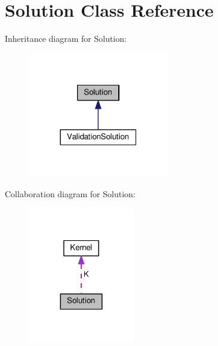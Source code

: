 \hypertarget{class_solution}{}\section{Solution Class Reference}
\label{class_solution}


Inheritance diagram for Solution\+:\nopagebreak
\begin{figure}[H]
\begin{center}
\leavevmode
\includegraphics[width=175pt]{class_solution__inherit__graph}
\end{center}
\end{figure}


Collaboration diagram for Solution\+:
\nopagebreak
\begin{figure}[H]
\begin{center}
\leavevmode
\includegraphics[width=132pt]{class_solution__coll__graph}
\end{center}
\end{figure}

